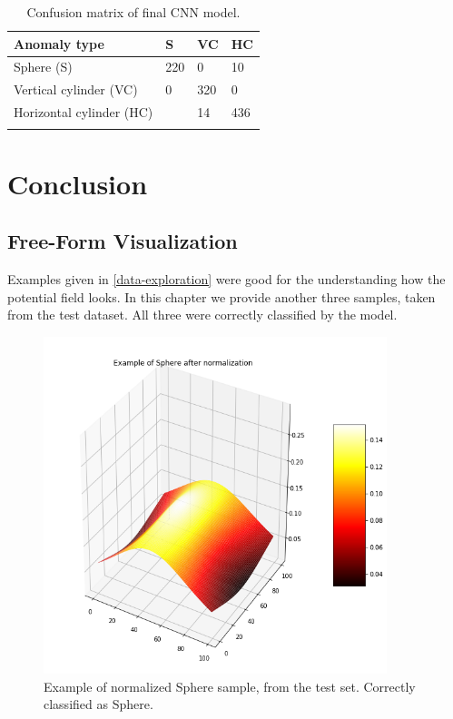 \documentclass{article}
\begin{document}
\begin{longtable}[c]{@{}llll@{}}
\toprule
Anomaly type & S & VC & HC\tabularnewline
\midrule
\endhead
Sphere (S) & 220 & 0 & 10\tabularnewline
Vertical cylinder (VC) & 0 & 320 & 0\tabularnewline
Horizontal cylinder (HC) & & 14 & 436\tabularnewline
\bottomrule
\caption[Confusion matrix of final CNN model]{Confusion matrix of final CNN model.}
\label{tab:ConfusionMatrixFinalModel}
\end{longtable}

\section{Conclusion}\label{conclusion}

\subsection{Free-Form Visualization}\label{Free-Form Visualization}

Examples given in \ref{data-exploration} were good for the understanding how the potential field
looks. In this chapter we provide another three samples, taken from the test dataset. All three
were correctly classified by the model.

\begin{figure}[!htp]
\centerline{\includegraphics[width=10cm]{img/sphere_normalized.png}}
\renewcommand{\figurename}{Figure}
\caption[Example of Sphere]{Example of normalized Sphere sample, from the test set. Correctly classified as Sphere.}
\label{fig:NormalizedSphere}
\end{figure}
\end{document}
